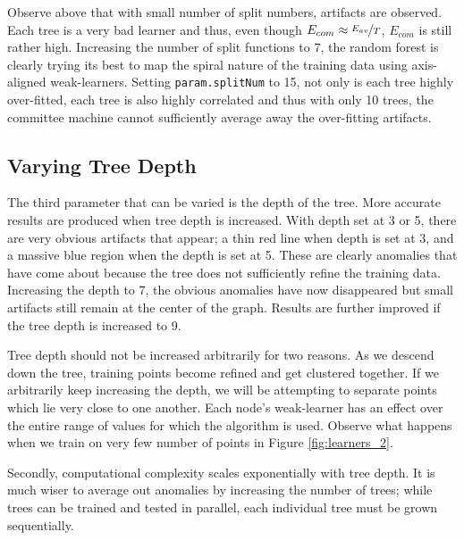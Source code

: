 \documentclass[a4paper,pra,twocolumn,10pt,aps,longbibliography,nobalancelastpage]{revtex4-1}
\begin{document}
Observe above that with small number of split numbers, artifacts are observed. Each tree is a very bad learner and thus, even though $E_{com}\approx\nicefrac{E_{av}}{T}$, $E_{com}$ is still rather high. Increasing the number of split functions to $7$, the random forest is clearly trying its best to map the spiral nature of the training data using axis-aligned weak-learners. Setting \texttt{param.splitNum} to 15, not only is each tree highly over-fitted, each tree is also highly correlated and thus with only 10 trees, the committee machine cannot sufficiently average away the over-fitting artifacts.

\subsection{Varying Tree Depth}

The third parameter that can be varied is the depth of the tree. More accurate results are produced when tree depth is increased. With depth set at 3 or 5, there are very obvious artifacts that appear; a thin red line when depth is set at 3, and a massive blue region when the depth is set at 5. These are clearly anomalies that have come about because the tree does not sufficiently refine the training data. Increasing the depth to 7, the obvious anomalies have now disappeared but small artifacts still remain at the center of the graph. Results are further improved if the tree depth is increased to 9. 

Tree depth should not be increased arbitrarily for two reasons. As we descend down the tree, training points become refined and get clustered together. If we arbitrarily keep increasing the depth, we will be attempting to separate points which lie very close to one another. Each node's weak-learner has an effect over the entire range of values for which the algorithm is used. Observe what happens when we train on very few number of points in Figure \ref{fig:learners_2}.

Secondly, computational complexity scales exponentially with tree depth. It is much wiser to average out anomalies by increasing the number of trees; while trees can be trained and tested in parallel, each individual tree must be grown sequentially.
\end{document}
